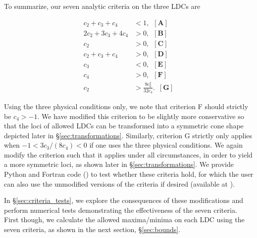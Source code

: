 To summarize, our seven analytic criteria on the three LDCs are

\begin{align}
c_2 + c_3 + c_4 &< 1,\,\,\,\mathbf{[A]}\nonumber\\
2 c_2 + 3 c_3 + 4 c_4 &> 0,\,\,\,\mathbf{[B]}\nonumber\\
c_2 &> 0, \,\,\,\mathbf{[C]}\nonumber\\
c_2 + c_3 + c_4 &> 0, \,\,\,\mathbf{[D]}\nonumber\\
c_3 &< 0, \,\,\,\mathbf{[E]}\nonumber\\
c_4 &> 0, \,\,\,\mathbf{[F]}\nonumber\\
c_2 &> \frac{9 c_3^2}{32 c_4}. \,\,\,\mathbf{[G]}
\label{eqn:ALLcriteria}
\end{align}

Using the three physical conditions only, we note that criterion F should
strictly be $c_4>-1$. We have modified this criterion to be slightly more 
conservative so that the loci of allowed LDCs can be transformed into a 
symmetric cone shape depicted later in \S\ref{sec:transformations}. Similarly, 
criterion G strictly only applies when $-1 < 3 c_3/(8 c_4) < 0$ if one uses 
the three physical conditions. We again modify the criterion such that it 
applies under all circumstances, in order to yield a more symmetric loci, as
shown later in \S\ref{sec:transformations}. We provide Python and Fortran code
(\LDC) to test whether these criteria hold, for which the user can also use
the unmodified versions of the criteria if desired (available at \link).

In \S\ref{sec:criteria_tests}, we explore the consequences of these 
modifications and perform numerical tests demonstrating the effectiveness of the 
seven criteria. First though, we calculate the allowed maxima/minima on each
LDC using the seven criteria, as shown in the next section, \S\ref{sec:bounds}.

